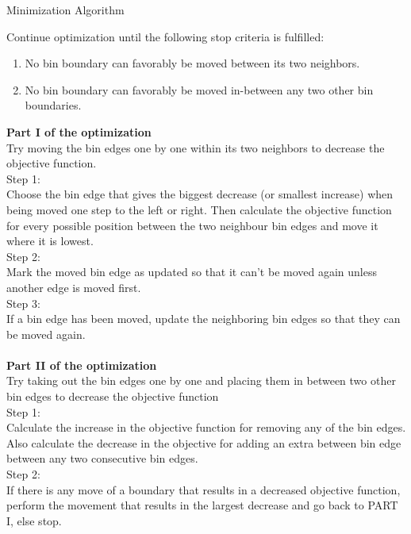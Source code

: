 \begin{algorithm}
	\caption{Minimization Algorithm}
	 Continue optimization until the following stop criteria is fulfilled: 
	\begin{enumerate}
		\item No bin boundary can favorably be moved between its two neighbors.  
		\item No bin boundary can favorably be moved in-between any two other bin boundaries. 
	\end{enumerate}
	{\bf Part I of the optimization}\\
	Try moving the bin edges one by one within its two neighbors to decrease the objective function. \\
	Step 1: \\
	Choose the bin edge that gives the biggest decrease
       (or smallest increase) when being moved one step to the left or right.
     Then calculate the objective function for every possible position between the two neighbour 
       bin edges and move it where it is lowest.\\
	Step 2: \\
	   Mark the moved bin edge as updated so that it can't be moved again unless another edge is moved first.\\
	   Step 3: \\
	   If a bin edge has been moved, update the neighboring bin edges so that they can be moved again.  \\\\
	   
	    {\bf Part II of the optimization}\\
	    Try taking out the bin edges one by one and placing them in between two other bin edges to decrease the objective function \\
	    Step 1: \\ 
	    Calculate the increase in the objective function for removing any of the bin edges. Also calculate the decrease in the objective for adding an extra between bin edge between any two consecutive bin edges.\\
	    Step 2: \\
	     If there is any move of a boundary that results in a decreased objective function, perform the movement that results in the largest decrease and go back to PART I, else stop. 


\label{Minimizer}
	   
\end{algorithm}
\newpage

